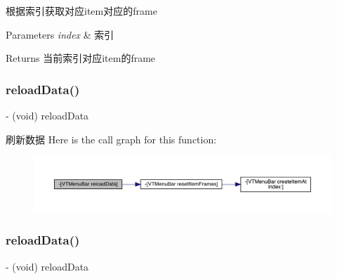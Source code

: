 根据索引获取对应item对应的frame


\begin{DoxyParams}{Parameters}
{\em index} & 索引\\
\hline
\end{DoxyParams}
\begin{DoxyReturn}{Returns}
当前索引对应item的frame 
\end{DoxyReturn}
\mbox{\label{interface_v_t_menu_bar_a40cf86d3f53b0694047557db6d73d3a8}} 
\subsubsection{\texorpdfstring{reload\+Data()}{reloadData()}\hspace{0.1cm}{\footnotesize\ttfamily [1/3]}}
{\footnotesize\ttfamily -\/ (void) reload\+Data \begin{DoxyParamCaption}{ }\end{DoxyParamCaption}}

刷新数据 Here is the call graph for this function\+:\nopagebreak
\begin{figure}[H]
\begin{center}
\leavevmode
\includegraphics[width=350pt]{interface_v_t_menu_bar_a40cf86d3f53b0694047557db6d73d3a8_cgraph}
\end{center}
\end{figure}
\mbox{\label{interface_v_t_menu_bar_a40cf86d3f53b0694047557db6d73d3a8}} 
\subsubsection{\texorpdfstring{reload\+Data()}{reloadData()}\hspace{0.1cm}{\footnotesize\ttfamily [2/3]}}
{\footnotesize\ttfamily -\/ (void) reload\+Data \begin{DoxyParamCaption}{ }\end{DoxyParamCaption}}

